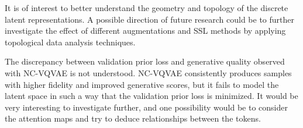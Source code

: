 \documentclass[../../thesis.tex]{subfiles}
\begin{document}
It is of interest to better understand the geometry and topology of the discrete latent representations. A possible direction of future research could be to further investigate the effect of different augmentations and SSL methods by applying topological data analysis techniques. \newline

The discrepancy between validation prior loss and generative quality observed with NC-VQVAE is not understood. NC-VQVAE consistently produces samples with higher fidelity and improved generative scores, but it fails to model the latent space in such a way that the validation prior loss is minimized. It would be very interesting to investigate further, and one possibility would be to consider the attention maps and try to deduce relationships between the tokens.
\end{document}
